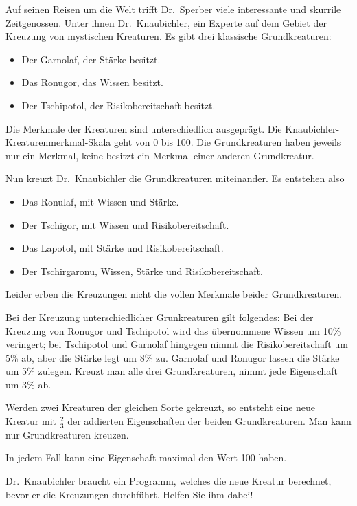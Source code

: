 \begin{aufgabe}
  \label{aufgabe:knaubichler}
  Auf seinen Reisen um die Welt trifft Dr.~Sperber
  viele interessante und skurrile Zeitgenossen. Unter ihnen
  Dr.~Knaubichler, ein Experte auf dem Gebiet der Kreuzung von
  mystischen Kreaturen.  Es gibt drei klassische Grundkreaturen:

  \begin{itemize}
  \item Der Garnolaf, der Stärke besitzt.
  \item Das Ronugor, das Wissen besitzt.
  \item Der Tschipotol, der Risikobereitschaft besitzt.
  \end{itemize}
  
  Die Merkmale der Kreaturen sind unterschiedlich ausgeprägt.  Die
  Knaubichler-Kreaturenmerkmal-Skala geht von 0 bis 100.  Die
  Grundkreaturen haben jeweils nur ein Merkmal, keine besitzt ein
  Merkmal einer anderen Grundkreatur.

  Nun kreuzt Dr.~Knaubichler die Grundkreaturen miteinander. Es
  entstehen also
  \begin{itemize}
  \item Das Ronulaf, mit Wissen und Stärke.
  \item Der Tschigor, mit Wissen und Risikobereitschaft.
  \item Das Lapotol, mit Stärke und Risikobereitschaft.
  \item Der Tschirgaronu, Wissen, Stärke und Risikobereitschaft.
  \end{itemize}
  
  Leider erben die Kreuzungen nicht die vollen Merkmale beider
  Grundkreaturen.

  Bei der Kreuzung unterschiedlicher Grunkreaturen gilt folgendes:
  Bei der Kreuzung von Ronugor und Tschipotol wird
  das übernommene Wissen um 10\% veringert; bei Tschipotol und
  Garnolaf hingegen nimmt die Risikobereitschaft um 5\% ab, aber die
  Stärke legt um 8\% zu. Garnolaf und Ronugor lassen die Stärke um 5\%
  zulegen. Kreuzt man alle drei Grundkreaturen, nimmt jede Eigenschaft
  um 3\% ab.
  
  Werden zwei Kreaturen der gleichen Sorte gekreuzt, so entsteht eine
  neue Kreatur mit $\frac{2}{3}$ der addierten Eigenschaften der
  beiden Grundkreaturen. Man kann nur Grundkreaturen kreuzen.

  In jedem Fall kann eine Eigenschaft maximal den Wert 100
  haben.
    
  Dr.~Knaubichler braucht ein Programm, welches die neue Kreatur
  berechnet, bevor er die Kreuzungen durchführt.  Helfen Sie ihm
  dabei!
  

\end{aufgabe}
